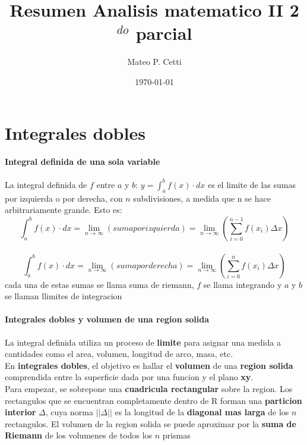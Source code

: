 \documentclass[11pt]{article}
\title{ Resumen Analisis matematico II 2$^{do}$ parcial}
\author{ Mateo P. Cetti }
\date{\today}
\begin{document}
\maketitle	
\pagebreak



\section{Integrales dobles}
\paragraph{Integral definida de una sola variable}
La integral definida de $f$ entre $a$ y $b$: $y = \int_{a}^{b} f(x) \cdot dx$ es el limite de las sumas por izquierda o por derecha, con $n$ subdivisiones, a medida que n se hace arbitrariamente grande. Esto es:
\begin{equation*}
	\int_{a}^{b}f(x) \cdot dx = \lim_{n \rightarrow \infty}(suma por izquierda)
	 = \lim_{n \rightarrow \infty}\left( \sum_{i=0}^{n-1} f(x_i)\Delta x \right) 
\end{equation*}\\
\begin{equation*}
	\int_{a}^{b}f(x) \cdot dx = \lim_{n \rightarrow \infty}(suma por derecha)
	 = \lim_{n \rightarrow \infty}\left( \sum_{i=0}^{n} f(x_i)\Delta x \right) 
\end{equation*}
cada una de estas sumas se llama suma de riemann, $f$ se llama integrando y $a$ y $b$ se llaman llimites de integracion\\
\paragraph{Integrales dobles y volumen de una region solida}
La integral definida utiliza un proceso de \textbf{limite} para asignar una medida a cantidades como el area, volumen, longitud de arco, masa, etc.\\
\linebreak
En \textbf{integrales dobles}, el objetivo es hallar el \textbf{volumen} de una \textbf{region solida} comprendida entre la superficie dada por una funcion y el plano \textbf{xy}.\\
\linebreak
Para empezar, se sobrepone una \textbf{cuadricula rectangular} sobre la region. Los rectangulos que se encuentran completamente dentro de R forman una \textbf{particion interior} $\Delta$, cuya norma $||\Delta||$ es la longitud de la \textbf{diagonal mas larga} de los $n$ rectangulos. El volumen de la region solida se puede aproximar por la \textbf{suma de Riemann} de los volumenes de todos los $n$ prismas
\end{document}
